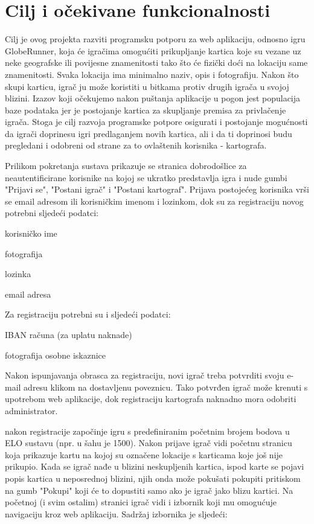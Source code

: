 		\section{Cilj i očekivane funkcionalnosti}
		
		Cilj je ovog projekta razviti programsku potporu za web aplikaciju, odnosno igru GlobeRunner, koja će igračima omogućiti prikupljanje kartica koje su vezane uz neke geografske ili povijesne znamenitosti tako što će fizički doći na lokaciju same znamenitosti. Svaka lokacija ima minimalno naziv, opis i fotografiju. Nakon što skupi karticu, igrač ju može koristiti u bitkama protiv drugih igrača u svojoj blizini. Izazov koji očekujemo nakon puštanja aplikacije u pogon jest populacija baze podataka jer je postojanje kartica za skupljanje premisa za privlačenje igrača. Stoga je cilj razvoja programske potpore osigurati i postojanje mogućnosti da igrači doprinesu igri predlaganjem novih kartica, ali i da ti doprinosi budu pregledani i odobreni od strane za to ovlaštenih korisnika - kartografa.

		
		Prilikom pokretanja sustava prikazuje se stranica dobrodošlice za neautentificirane korisnike na kojoj se ukratko predstavlja igra i nude gumbi "Prijavi se", "Postani igrač" i "Postani kartograf".  Prijava postojećeg korisnika vrši se email adresom ili korisničkim imenom i lozinkom, dok su za registraciju novog  potrebni sljedeći podatci:
		\begin{packed_item}
		    \item korisničko ime
		    \item fotografija
		    \item lozinka
		    \item email adresa
		\end{packed_item}
		
		Za registraciju  potrebni su i sljedeći podatci:
		\begin{packed_item}
		    \item IBAN računa (za uplatu naknade)
		    \item fotografija osobne iskaznice
		\end{packed_item}
		
		Nakon ispunjavanja obrasca za registraciju, novi igrač treba potvrditi svoju e-mail adresu klikom na dostavljenu poveznicu. Tako potvrđen igrač može krenuti s upotrebom web aplikacije, dok registraciju kartografa naknadno mora odobriti administrator.
		
		 nakon registracije započinje igru s predefiniranim početnim brojem bodova u ELO sustavu (npr. u šahu je 1500). Nakon prijave igrač vidi početnu stranicu koja prikazuje kartu na kojoj su označene lokacije s karticama koje još nije prikupio. Kada se igrač nađe u blizini neskupljenih kartica, ispod karte se pojavi popis kartica u neposrednoj blizini, njih onda može pokušati pokupiti pritiskom na gumb "Pokupi" koji će to dopustiti samo ako je igrač jako blizu kartici. Na početnoj (i svim ostalim) stranici igrač vidi i izbornik koji mu omogućuje navigaciju kroz web aplikaciju. Sadržaj izbornika je sljedeći:
		
